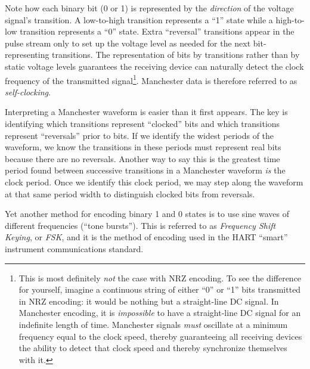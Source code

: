 Note how each binary bit (0 or 1) is represented by the \textit{direction} of the voltage signal's transition.  A low-to-high transition represents a ``1'' state while a high-to-low transition represents a ``0'' state.  Extra ``reversal'' transitions appear in the pulse stream only to set up the voltage level as needed for the next bit-representing transitions.  The representation of bits by transitions rather than by static voltage levels guarantees the receiving device can naturally detect the clock frequency of the transmitted signal\footnote{This is most definitely \textit{not} the case with NRZ encoding.  To see the difference for yourself, imagine a continuous string of either ``0'' or ``1'' bits transmitted in NRZ encoding: it would be nothing but a straight-line DC signal.  In Manchester encoding, it is \textit{impossible} to have a straight-line DC signal for an indefinite length of time.  Manchester signals \textit{must} oscillate at a minimum frequency equal to the clock speed, thereby guaranteeing all receiving devices the ability to detect that clock speed and thereby synchronize themselves with it.}.  Manchester data is therefore referred to as \textit{self-clocking}.

Interpreting a Manchester waveform is easier than it first appears.  The key is identifying which transitions represent ``clocked'' bits and which transitions represent ``reversals'' prior to bits.  If we identify the widest periods of the waveform, we know the transitions in these periods must represent real bits because there are no reversals.  Another way to say this is the greatest time period found between successive transitions in a Manchester waveform \textit{is} the clock period.  Once we identify this clock period, we may step along the waveform at that same period width to distinguish clocked bits from reversals.

\filbreak

Yet another method for encoding binary 1 and 0 states is to use sine waves of different frequencies (``tone bursts'').  This is referred to as \textit{Frequency Shift Keying}, or \textit{FSK}, and it is the method of encoding used in the HART ``smart'' instrument communications standard.      

